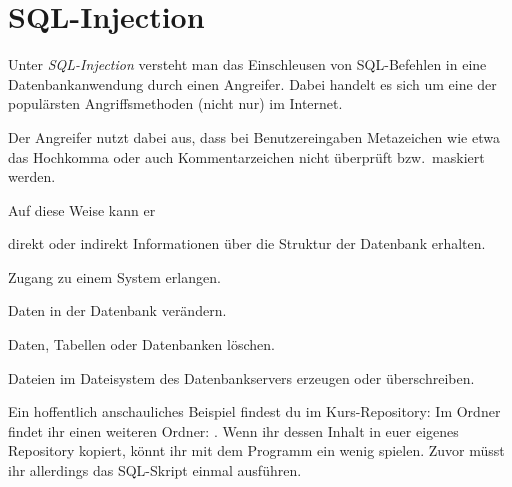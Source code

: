 \clearpage

\rehead[]{\textcolor{lightblue}{AvHG, Inf, My}}
\lohead[]{\textcolor{lightblue}{AvHG, Inf, My}}

\lstset{style=myJava}


\section{SQL-Injection \tagLK}

Unter \emph{SQL-Injection} versteht man das Einschleusen von SQL-Befehlen
in eine Datenbankanwendung durch einen Angreifer. Dabei handelt es sich um eine
der populärsten Angriffsmethoden (nicht nur) im Internet.

Der Angreifer nutzt dabei aus, dass bei Benutzereingaben Metazeichen wie etwa
das Hochkomma oder auch Kommentarzeichen nicht überprüft bzw.\ maskiert werden.

Auf diese Weise kann er 

\begin{compactitem}
\item direkt oder indirekt Informationen über die Struktur der
Datenbank erhalten.
\item Zugang zu einem System erlangen.
\item Daten in der Datenbank verändern.
\item Daten, Tabellen oder Datenbanken löschen.
\item Dateien im Dateisystem des Datenbankservers erzeugen oder überschreiben.
\end{compactitem}

Ein hoffentlich anschauliches Beispiel findest du im Kurs-Repository: Im Ordner
\linebreak {} findet ihr einen weiteren Ordner:
. Wenn ihr dessen Inhalt in euer eigenes Repository
kopiert, könnt ihr mit dem Programm  ein wenig
\glqq spielen\grqq . Zuvor müsst ihr allerdings das SQL-Skript
 einmal ausführen.

